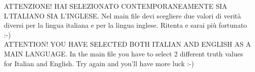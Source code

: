 \documentclass[11pt]{book}
\begin{document}
 ATTENZIONE! HAI SELEZIONATO CONTEMPORANEAMENTE SIA L'ITALIANO SIA L'INGLESE. Nel main file devi scegliere due valori di verit\`a
diversi per la lingua italiana e per la lingua inglese. Ritenta e sarai pi\`u fortunato :-) \\

ATTENTION! YOU HAVE SELECTED BOTH ITALIAN AND ENGLISH AS A MAIN LANGUAGE. In the main file you have to select 2 different truth values for
Italian and English. Try again and you'll have more luck :-)
\end{document}
